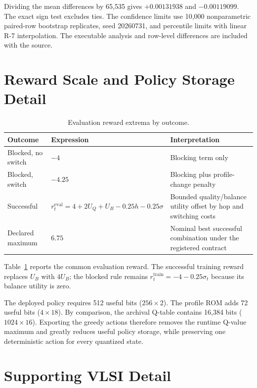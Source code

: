 Dividing the mean differences by 65,535 gives $+0.00131938$ and
$-0.00119099$. The exact sign test excludes ties. The confidence limits use 10,000
nonparametric paired-row bootstrap replicates, seed 20260731, and percentile limits
with linear R-7 interpolation. The executable analysis and row-level differences are
included with the source.

\section{Reward Scale and Policy Storage Detail}

\begin{table}[H]
\centering
\caption{Evaluation reward extrema by outcome.}
\label{tab:reward-extrema}
\begin{tabularx}{\textwidth}{@{}p{}p{}X@{}}
\toprule
\textbf{Outcome} & \textbf{Expression} & \textbf{Interpretation}\\
\midrule
Blocked, no switch & $-4$ & Blocking term only\\
Blocked, switch & $-4.25$ & Blocking plus profile-change penalty\\
Successful & $r_t^{\mathrm{eval}}=4+2U_Q+U_B-0.25h-0.25\sigma$ & Bounded quality/balance utility
offset by hop and switching costs\\
Declared maximum & $6.75$ & Nominal best successful combination under the
registered contract\\
\bottomrule
\end{tabularx}
\end{table}

Table~\ref{tab:reward-extrema} reports the common evaluation reward. The successful
training reward replaces $U_B$ with $4U_B$; the blocked rule remains
$r_t^{\mathrm{train}}=-4-0.25\sigma_t$ because its balance utility is zero.

The deployed policy requires 512 useful bits ($256\times2$). The profile ROM adds
72 useful bits ($4\times18$). By comparison, the archival Q-table contains 16,384
bits ($1024\times16$). Exporting the greedy actions therefore removes the runtime
Q-value maximum and greatly reduces useful policy storage, while preserving one
deterministic action for every quantized state.

\section{Supporting VLSI Detail}

